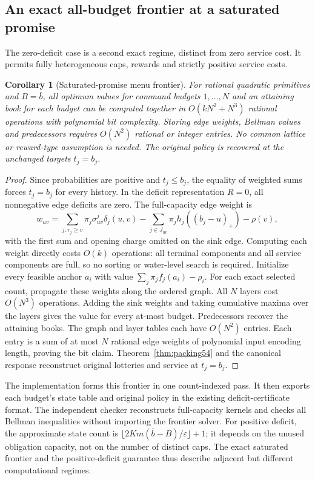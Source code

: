 \documentclass[11pt,letterpaper]{article}
\newtheorem{corollary}[theorem]{Corollary}
\theoremstyle{definition}\newtheorem{remark}[theorem]{Remark}
\begin{document}
\subsection{An exact all-budget frontier at a saturated promise}\label{sec:saturation58}
The zero-deficit case is a second exact regime, distinct from zero service cost. It permits fully heterogeneous caps, rewards and strictly positive service costs.
\begin{corollary}[Saturated-promise menu frontier]\label{cor:saturation58}
For rational quadratic primitives and $B=\bar b$, all optimum values for command budgets $1,\ldots,N$ and an attaining book for each budget can be computed together in $O(kN^2+N^3)$ rational operations with polynomial bit complexity. Storing edge weights, Bellman values and predecessors requires $O(N^2)$ rational or integer entries. No common lattice or reward-type assumption is needed. The original policy is recovered at the unchanged targets $t_j=b_j$.
\end{corollary}
\begin{proof}
Since probabilities are positive and $t_j\leq b_j$, the equality of weighted sums forces $t_j=b_j$ for every history. In the deficit representation $R=0$, all nonnegative edge deficits are zero. The full-capacity edge weight is
\[
 w_{uv}=\sum_{j:\tau_j\geq v}\pi_j\sigma^j_{uv}\delta_j(u,v)
        -\sum_{j\in J_{uv}}\pi_jh_j((b_j-u)_+)-\rho(v),
\]
with the first sum and opening charge omitted on the sink edge. Computing each weight directly costs $O(k)$ operations: all terminal components and all service components are full, so no sorting or water-level search is required. Initialize every feasible anchor $a_i$ with value $\sum_j\pi_jf_j(a_i)-\rho_i$. For each exact selected count, propagate these weights along the ordered graph. All $N$ layers cost $O(N^3)$ operations. Adding the sink weights and taking cumulative maxima over the layers gives the value for every at-most budget. Predecessors recover the attaining books. The graph and layer tables each have $O(N^2)$ entries. Each entry is a sum of at most $N$ rational edge weights of polynomial input encoding length, proving the bit claim. Theorem~\ref{thm:packing54} and the canonical response reconstruct original lotteries and service at $t_j=b_j$.
\end{proof}

The implementation forms this frontier in one count-indexed pass. It then exports each budget's state table and original policy in the existing deficit-certificate format. The independent checker reconstructs full-capacity kernels and checks all Bellman inequalities without importing the frontier solver. For positive deficit, the approximate state count is $\lfloor2Km(\bar b-B)/\varepsilon\rfloor+1$; it depends on the unused obligation capacity, not on the number of distinct caps. The exact saturated frontier and the positive-deficit guarantee thus describe adjacent but different computational regimes.
\end{document}
